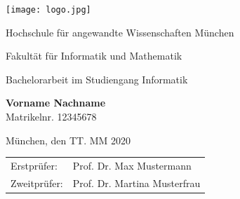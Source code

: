 

\pagestyle{scrheadings}
\chead{\headmark} %
\overfullrule=3pt


\begin{titlepage}
	\centering
	\setlength{\parindent}{0pt}
	
	\singlespacing
	
	\begin{flushright}
		\texttt{[image: logo.jpg]}
	\end{flushright}
	
	\vspace*{10mm}
	
	\begin{Huge}
		Hochschule für angewandte Wissenschaften München \\
	\end{Huge}

	\vspace{10mm}

	\begin{Large}
		Fakultät für Informatik und Mathematik \\
	\end{Large}
	
	\vspace{20mm}
	
	{
		\doublespacing
		\large
		\sffamily
		\bfseries
		\begin{Huge}
		\end{Huge}
		\par
	}

	\singlespacing

	\vspace{20mm}
	\normalfont
	Bachelorarbeit im Studiengang Informatik
	
	\vspace{20mm}
	\textsf{\textbf{Vorname Nachname}}\\
	Matrikelnr. 12345678
	
	\vspace{0.5\baselineskip}
	München, den TT. MM 2020
	
	\vfill
	
	\begin{tabular}{@{}ll}
		Erstprüfer: & Prof. Dr. Max Mustermann \\
		Zweitprüfer: & Prof. Dr. Martina Musterfrau \\
	\end{tabular}

\end{titlepage}




